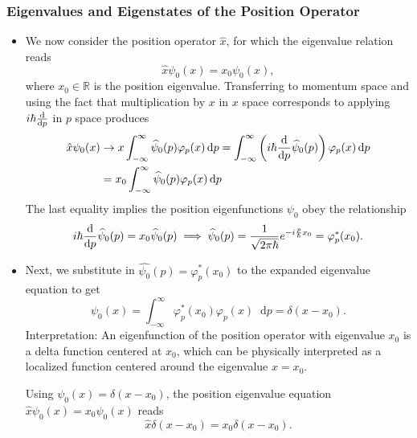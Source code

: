 \documentclass[11pt, a4paper]{article}
\newcommand{\diff}{\mathop{}\!\mathrm{d}} %
\newcommand{\F}[1]{\widehat{#1}} %
\begin{document}
\subsubsection{Eigenvalues and Eigenstates of the Position Operator}
\begin{itemize}
    \item We now consider the position operator $ \hat{x} $, for which the eigenvalue relation reads
    \begin{equation*}
        \hat{x}\psi_{0}(x) = x_{0} \psi_{0}(x),
    \end{equation*}
    where $ x_{0} \in \mathbb{R} $ is the position eigenvalue. Transferring to momentum space and using the fact that multiplication by $ x $ in $ x $ space corresponds to applying $ i \hbar \dv{p} $ in $ p $ space produces
    \begin{align*}
        \hat{x} \psi_{0}(x) &\to x \int_{-\infty}^{\infty}\F{\psi}_{0}(p)\varphi_{p}(x)\diff p = \int_{-\infty}^{\infty} \left( i \hbar \dv{p}\F{\psi}_{0}(p) \right)\varphi_{p}(x) \diff p \\ & = x_{0} \int_{-\infty}^{\infty}\F{\psi}_{0}(p)\varphi_{p}(x)\diff p 
    \end{align*}
    The last equality implies the position eigenfunctions $ \psi_{0} $ obey the relationship
    \begin{equation*}
        i \hbar \dv{p} \F{\psi}_{0}(p) = x_{0} \F{\psi}_{0}(p) \implies \F{\psi}_{0}(p) = \frac{1}{\sqrt{2\pi \hbar}} e^{-i \frac{p}{\hbar}x_{0}} = \varphi_{p}^{*}(x_{0}).
    \end{equation*}

    \item Next, we substitute in $ \F{\psi_{0}}(p) = \varphi_{p}^{*}(x_{0}) $ to the expanded eigenvalue equation to get
    \begin{equation*}
        \psi_{0}(x) = \int_{-\infty}^{\infty}\varphi_{p}^{*}(x_{0}) \varphi_{p}(x) \diff p = \delta(x - x_{0}).
    \end{equation*}
    Interpretation: An eigenfunction of the position operator with eigenvalue $ x_{0} $ is a delta function centered at $ x_{0} $, which can be physically interpreted as a localized function centered around the eigenvalue $ x = x_{0} $.

    Using $ \psi_{0}(x) = \delta(x - x_{0}) $, the position eigenvalue equation $ \hat{x}\psi_{0}(x) = x_{0} \psi_{0}(x) $ reads
    \begin{equation*}
        \hat{x} \delta(x - x_{0}) = x_{0} \delta(x - x_{0}).
    \end{equation*}
    
\end{itemize}
\end{document}
